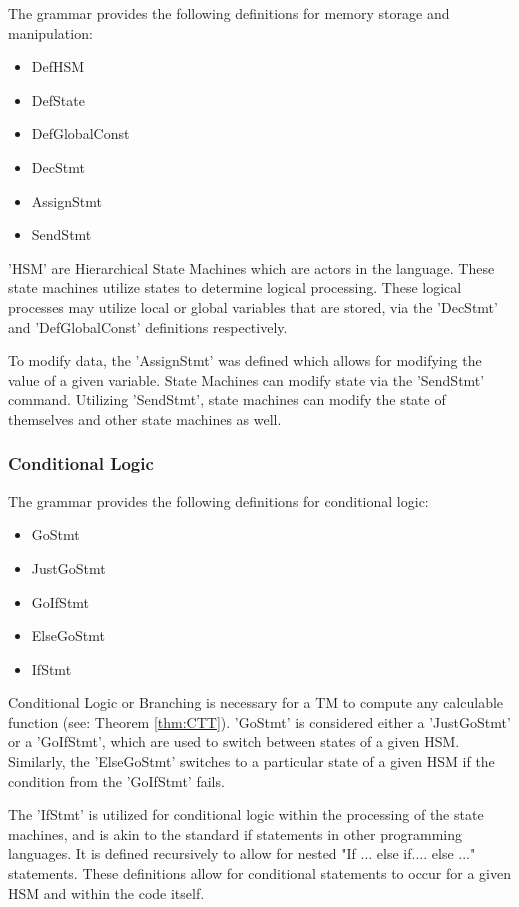 The grammar provides the following definitions for memory storage and manipulation:
\begin{itemize}
    \item DefHSM
    \item DefState
    \item DefGlobalConst
    \item DecStmt
    \item AssignStmt
    \item SendStmt
\end{itemize}

'HSM' are Hierarchical State Machines which are actors in the language.
These state machines utilize states to determine logical processing.
These logical processes may utilize local or global variables that are stored, via the 'DecStmt' and 'DefGlobalConst' definitions respectively.

To modify data, the 'AssignStmt' was defined which allows for modifying the value of a given variable.
State Machines can modify state via the 'SendStmt' command.
Utilizing 'SendStmt', state machines can modify the state of themselves and other state machines as well.

\subsubsection{Conditional Logic}\label{subsubsec:CondLog}

The grammar provides the following definitions for conditional logic:
\begin{itemize}
    \item GoStmt
    \item JustGoStmt
    \item GoIfStmt
    \item ElseGoStmt
    \item IfStmt
\end{itemize}

Conditional Logic or Branching is necessary for a TM to compute any calculable function (see: Theorem \ref{thm:CTT}).
'GoStmt' is considered either a 'JustGoStmt' or a 'GoIfStmt', which are used to switch between states of a given HSM.
Similarly, the 'ElseGoStmt' switches to a particular state of a given HSM if the condition from the 'GoIfStmt' fails.

The 'IfStmt' is utilized for conditional logic within the processing of the state machines, and is akin to the standard if statements in other programming languages.
It is defined recursively to allow for nested "If ... else if.... else ..." statements.
These definitions allow for conditional statements to occur for a given HSM and within the code itself.


